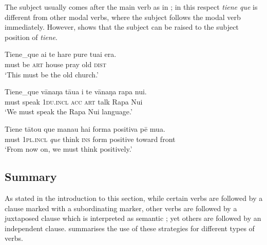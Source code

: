 The subject usually comes after the main verb as in ; in this respect \textit{tiene que} is different from other modal verbs, where the subject follows the modal verb immediately. However,  shows that the subject can be raised to the subject position of \textit{tiene}.

\ea\label{ex:11.85}
\gll Tiene\_que ai te hare pure tuai era.\\
must be \textsc{art} house pray old \textsc{dist}\\

\glt 
‘This must be the old church.’ \textstyleExampleref{[R416.060]} 
\z

\ea\label{ex:11.86}
\gll Tiene\_que vānaŋa tāua i te vānaŋa rapa nui. \\
must speak \textsc{1du.incl} \textsc{acc} \textsc{art} talk Rapa Nui \\

\glt 
‘We must speak the Rapa Nui language.’  
\z

\ea\label{ex:11.87}
\gll Tiene tātou que mana{\ꞌ}u hai forma positiva pē mu{\ꞌ}a. \\
must \textsc{1pl.incl} \textit{que} think \textsc{ins} form positive toward front \\

\glt 
‘From now on, we must think positively.’  
\z
{}

\subsection{Summary}\label{sec:11.3.7}

As stated in the introduction to this section, while certain verbs are followed by a  clause marked with a subordinating marker, other verbs are followed by a juxtaposed clause which is interpreted as semantic ; yet others are followed by an independent clause.  summarises the use of these strategies for different types of verbs.

